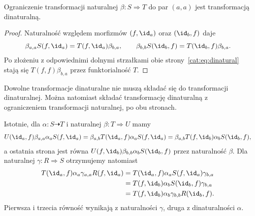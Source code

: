 \begin{stwierdzenie}\label{cat:prop:dinatural-natural}
Ograniczenie transformacji naturalnej $\beta:S\Rightarrow T$ do par $(a,a)$ jest transformacją dinaturalną.
\end{stwierdzenie}
\begin{proof}
Naturalność względem morfizmów $(f,\id_a)$ oraz $(\id_b,f)$ daje
\[
 \beta_{a,a}S(f,\id_a)=T(f,\id_a)\beta_{b,a},
 \qquad
 \beta_{b,b}S(\id_b,f)=T(\id_b,f)\beta_{b,a}.
\]
Po złożeniu z odpowiednimi dolnymi strzałkami obie strony~\eqref{cat:eq:dinatural} stają się $T(f,f)\beta_{b,a}$ przez funktorialność $T$.
\end{proof}
\begin{uwaga}\label{cat:rem:dinatural-composition}
Dowolne transformacje dinaturalne nie muszą składać się do transformacji dinaturalnej. Można natomiast składać transformację dinaturalną z ograniczeniem transformacji naturalnej, po obu stronach.
\end{uwaga}
Istotnie, dla $\alpha:S\dashrightarrow T$ i naturalnej $\beta:T\Rightarrow U$ mamy
\[
 U(\id_a,f)\beta_{a,a}\alpha_a S(f,\id_a)
 =\beta_{a,b}T(\id_a,f)\alpha_a S(f,\id_a)
 =\beta_{a,b}T(f,\id_b)\alpha_b S(\id_b,f),
\]
a ostatnia strona jest równa $U(f,\id_b)\beta_{b,b}\alpha_b S(\id_b,f)$ przez naturalność $\beta$. Dla naturalnej $\gamma:R\Rightarrow S$ otrzymujemy natomiast
\begin{align*}
 T(\id_a,f)\alpha_a\gamma_{a,a}R(f,\id_a)
 &=T(\id_a,f)\alpha_a S(f,\id_a)\gamma_{b,a}\\
 &=T(f,\id_b)\alpha_b S(\id_b,f)\gamma_{b,a}\\
 &=T(f,\id_b)\alpha_b\gamma_{b,b}R(\id_b,f).
\end{align*}
Pierwsza i trzecia równość wynikają z naturalności $\gamma$, druga z dinaturalności $\alpha$.
